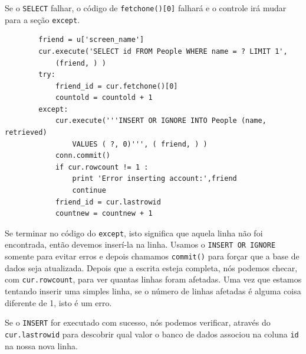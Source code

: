
Se o {\tt SELECT} falhar, o código de {\tt fetchone()[0]} falhará e o controle
irá mudar para a seção {\tt except}.

\beforeverb
\begin{verbatim}
        friend = u['screen_name']
        cur.execute('SELECT id FROM People WHERE name = ? LIMIT 1',
            (friend, ) )
        try:
            friend_id = cur.fetchone()[0]
            countold = countold + 1
        except:
            cur.execute('''INSERT OR IGNORE INTO People (name, retrieved) 
                VALUES ( ?, 0)''', ( friend, ) )
            conn.commit()
            if cur.rowcount != 1 :
                print 'Error inserting account:',friend
                continue
            friend_id = cur.lastrowid
            countnew = countnew + 1
\end{verbatim}
\afterverb
%

Se terminar no código do {\tt except}, isto significa que aquela linha não foi
encontrada, então devemos inserí-la na linha. Usamos o {\tt INSERT OR IGNORE}
somente para evitar erros e depois chamamos {\tt commit()} para forçar que a
base de dados seja atualizada. Depois que a escrita esteja completa, nós
podemos checar, com {\tt cur.rowcount}, para ver quantas linhas foram afetadas.
Uma vez que estamos tentando inserir uma simples linha, se o número de linhas
afetadas é alguma coisa diferente de 1, isto é um erro.


Se o {\tt INSERT} for executado com sucesso, nós podemos verificar, através do
{\tt cur.lastrowid} para descobrir qual valor o banco de dados associou na
coluna {\tt id} na nossa nova linha.

